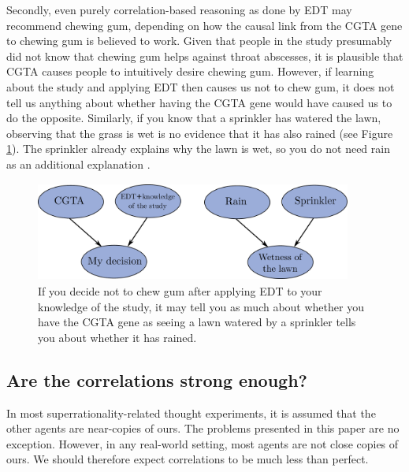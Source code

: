 Secondly, even purely correlation-based reasoning as done by EDT may
recommend chewing gum, depending on how the causal link from the CGTA
gene to chewing gum is believed to work. Given that people in the study
presumably did not know that chewing gum helps against throat abscesses,
it is plausible that CGTA causes people to intuitively desire chewing
gum. However, if learning about the study and applying EDT then causes
us not to chew gum, it does not tell us anything about whether having
the CGTA gene would have caused us to do the opposite. Similarly, if you
know that a sprinkler has watered the lawn, observing that the grass is
wet is no evidence that it has also rained (see Figure
\ref{tickle-defense}). The sprinkler already explains why the lawn is wet,
so you do not need rain as an additional explanation
\parencite{Ahmed2014-ec}.


\begin{figure}[h!]
    \centering
    \includegraphics[width=4.09792in,height=1.27975in]{figs/tickle-defense}
    \caption{If you decide not to chew gum after applying EDT
to your knowledge of the study, it may tell you as much about whether
you have the CGTA gene as seeing a lawn watered by a sprinkler tells you
about whether it has rained.}
    \label{tickle-defense}
\end{figure}

\hypertarget{are-the-correlations-strong-enough}{\subsection{Are the
correlations strong enough?}\label{are-the-correlations-strong-enough}}

In most superrationality-related thought experiments, it is assumed that the
other agents are near-copies of ours. The problems presented in this
paper are no exception. However, in any real-world setting, most agents
are not close copies of ours. We should therefore expect correlations to
be much less than perfect.

